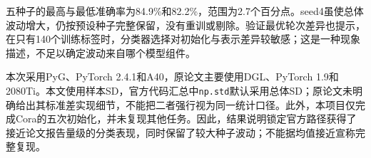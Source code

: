 五种子的最高与最低准确率为84.9\%和82.2\%，范围为2.7个百分点。seed4虽使总体波动增大，仍按预设种子完整保留，没有重训或剔除。验证最优轮次差异也提示，在只有140个训练标签时，分类器选择对初始化与表示差异较敏感；这是一种现象描述，不足以确定波动来自哪个模型组件。

本次采用PyG、PyTorch 2.4.1和A40，原论文主要使用DGL、PyTorch 1.9和2080Ti。本文使用样本SD，官方代码汇总中\texttt{np.std}默认采用总体SD；原论文未明确给出其标准差实现细节，不能把二者强行视为同一统计口径。此外，本项目仅完成Cora的五次初始化，并未复现其他任务。因此，结果说明锁定官方路径获得了接近论文报告量级的分类表现，同时保留了较大种子波动；不能据均值接近宣称完整复现。
